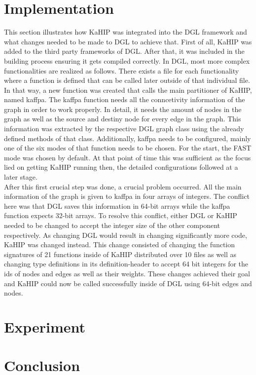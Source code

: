 \documentclass[acmsmall,nonacm,screen,review]{acmart}
\begin{document}
\section{Implementation}
This section illustrates how KaHIP was integrated into the DGL framework and what changes needed to be made to DGL to achieve that.
First of all, KaHIP was added to the third party frameworks of DGL. After that, it was included in the building process ensuring it gets compiled correctly. In DGL, most more complex functionalities are realized as follows. There exists a file for each functionality where a function is defined that can be called later outside of that individual file. In that way, a new function was created that calls the main partitioner of KaHIP, named kaffpa. The kaffpa function needs all the conncetivity information of the graph in order to work properly. In detail, it needs the amount of nodes in the graph as well as the source and destiny node for every edge in the graph. This information was extracted by the respective DGL graph class using the already defined methods of that class. Additionally, kaffpa needs to be configured, mainly one of the six modes of that function needs to be chosen. For the start, the FAST mode was chosen by default. At that point of time this was sufficient as the focus lied on getting KaHIP running then, the detailed configurations followed at a later stage.\\
After this first crucial step was done, a crucial problem occurred. All the main information of the graph is given to kaffpa in four arrays of integers. The conflict here was that DGL saves this information in 64-bit arrays while the kaffpa function expects 32-bit arrays. To resolve this conflict, either DGL or KaHIP needed to be changed to accept the integer size of the other component respectively. As changing DGL would result in changing significantly more code, KaHIP was changed instead. This change consisted of changing the function signatures of 21 functions inside of KaHIP distributed over 10 files as well as changing type definitions in its definition-header to accept 64 bit integers for the ids of nodes and edges as well as their weights. These changes achieved their goal and KaHIP could now be called successfully inside of DGL using 64-bit edges and nodes.\\
\section{Experiment}

\section{Conclusion}



\end{document}
